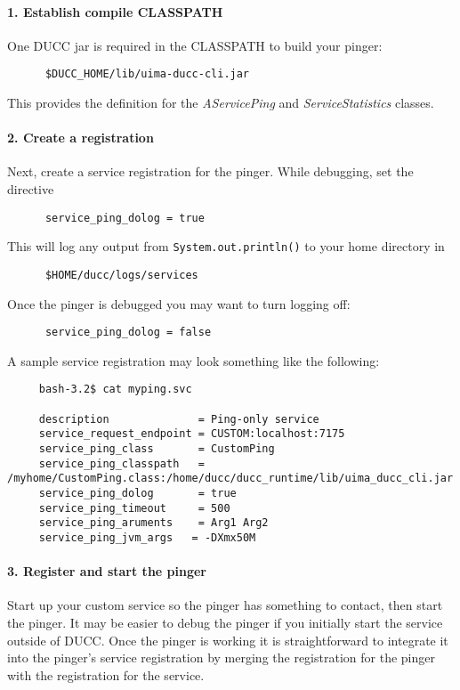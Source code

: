       \paragraph{1. Establish compile CLASSPATH} One DUCC jar is required in the CLASSPATH to build your pinger:
\begin{verbatim}
      $DUCC_HOME/lib/uima-ducc-cli.jar
\end{verbatim}      
      This provides the definition for the {\em AServicePing} and {\em ServiceStatistics} classes.

      \paragraph{2. Create a registration}Next, create a service registration for the pinger.  While
      debugging, set the directive
\begin{verbatim}
      service_ping_dolog = true
\end{verbatim}
      This will log any output from  {\tt System.out.println()} to your home directory in
\begin{verbatim}
      $HOME/ducc/logs/services
\end{verbatim}

      Once the pinger is debugged you may want to turn logging off:
\begin{verbatim}
      service_ping_dolog = false
\end{verbatim}
      
      A sample service registration may look something like the following:
\begin{verbatim}
     bash-3.2$ cat myping.svc

     description              = Ping-only service
     service_request_endpoint = CUSTOM:localhost:7175
     service_ping_class       = CustomPing
     service_ping_classpath   = /myhome/CustomPing.class:/home/ducc/ducc_runtime/lib/uima_ducc_cli.jar
     service_ping_dolog       = true
     service_ping_timeout     = 500
     service_ping_aruments    = Arg1 Arg2
     service_ping_jvm_args   = -DXmx50M
\end{verbatim}
       
      \paragraph{3. Register and start the pinger} Start up your custom service so the pinger has something to contact, then start
      the pinger.  It may be easier to debug the pinger if you initially start the service outside of DUCC. Once
      the pinger is working it is straightforward to integrate it into the pinger's service registration by merging
      the registration for the pinger with the registration for the service.


